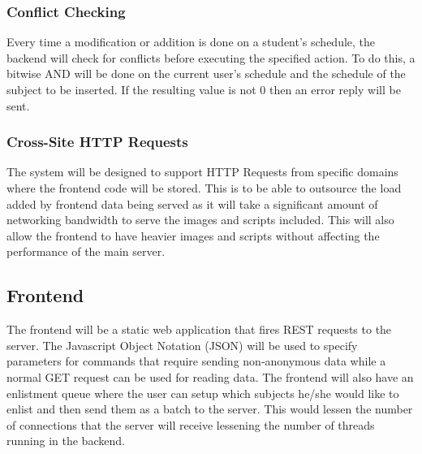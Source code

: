 \documentclass{sigchi}
\begin{document}
\subsubsection{Conflict Checking}

Every time a modification or addition is done on a student's schedule, the 
backend will check for conflicts before executing the specified action. 
To do this, a bitwise AND will be done on the current user's schedule and the
schedule of the subject to be inserted. If the resulting value is not 0 then
an error reply will be sent.

\subsubsection{Cross-Site HTTP Requests}

The system will be designed to support HTTP Requests from specific domains
where the frontend code will be stored. This is to be able to outsource the load
added by frontend data being served as it will take a significant amount of
networking bandwidth to serve the images and scripts included. This will also
allow the frontend to have heavier images and scripts without affecting the 
performance of the main server.


\subsection{Frontend}

The frontend will be a static web application that fires REST requests to the
server. The Javascript Object Notation (JSON) will be used to specify parameters
for commands that require sending non-anonymous data while a normal GET request
can be used for reading data. The frontend will also have an enlistment queue
where the user can setup which subjects he/she would like to enlist and then
send them as a batch to the server. This would lessen the number of connections
that the server will receive lessening the number of threads running in the 
backend.




% 
% 

\cleardoublepage
\end{document}
